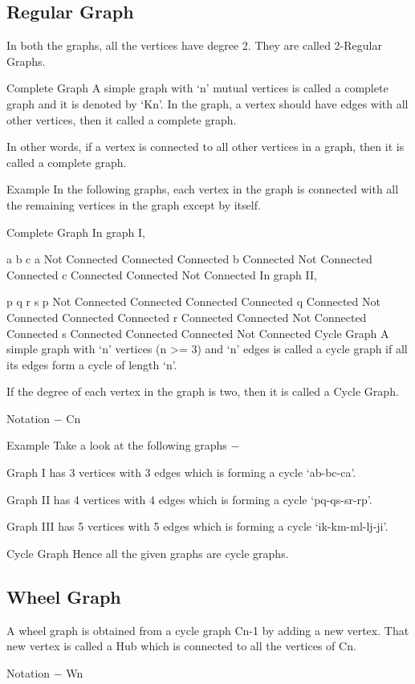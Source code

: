 \subsection{Regular Graph}
In both the graphs, all the vertices have degree 2. They are called 2-Regular Graphs.

Complete Graph
A simple graph with ‘n’ mutual vertices is called a complete graph and it is denoted by ‘Kn’. In the graph, a vertex should have edges with all other vertices, then it called a complete graph.

In other words, if a vertex is connected to all other vertices in a graph, then it is called a complete graph.

Example
In the following graphs, each vertex in the graph is connected with all the remaining vertices in the graph except by itself.

Complete Graph
In graph I,

a	b	c
a	Not Connected	Connected	Connected
b	Connected	Not Connected	Connected
c	Connected	Connected	Not Connected
In graph II,

p	q	r	s
p	Not Connected	Connected	Connected	Connected
q	Connected	Not Connected	Connected	Connected
r	Connected	Connected	Not Connected	Connected
s	Connected	Connected	Connected	Not Connected
Cycle Graph
A simple graph with ‘n’ vertices (n >= 3) and ‘n’ edges is called a cycle graph if all its edges form a cycle of length ‘n’.

If the degree of each vertex in the graph is two, then it is called a Cycle Graph.

Notation − Cn

Example
Take a look at the following graphs −

Graph I has 3 vertices with 3 edges which is forming a cycle ‘ab-bc-ca’.

Graph II has 4 vertices with 4 edges which is forming a cycle ‘pq-qs-sr-rp’.

Graph III has 5 vertices with 5 edges which is forming a cycle ‘ik-km-ml-lj-ji’.

Cycle Graph
Hence all the given graphs are cycle graphs.

\subsection{Wheel Graph}
A wheel graph is obtained from a cycle graph Cn-1 by adding a new vertex. That new vertex is called a Hub which is connected to all the vertices of Cn.

Notation − Wn

